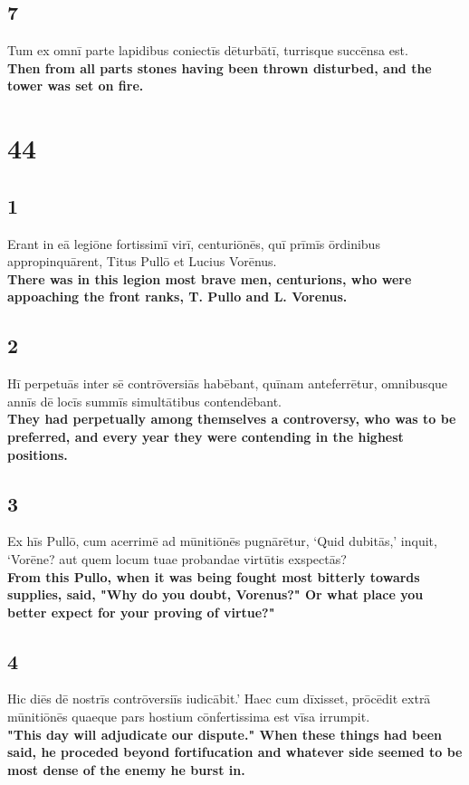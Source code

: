 \documentclass{article}
\begin{document}
\subsection*{7}
Tum ex omnī parte lapidibus coniectīs dēturbātī, turrisque succēnsa est.\\
\textbf{Then from all parts stones having been thrown disturbed, and the tower was set on fire.}



\section*{44}

\subsection*{1}
Erant in eā legiōne fortissimī virī, centuriōnēs, quī prīmīs ōrdinibus appropinquārent, Titus Pullō et Lucius Vorēnus. \\
\textbf{There was in this legion most brave men, centurions, who were appoaching the front ranks, T. Pullo and L. Vorenus.}

\subsection*{2}
Hī perpetuās inter sē contrōversiās habēbant, quīnam anteferrētur, omnibusque annīs dē locīs summīs simultātibus contendēbant. \\
\textbf{They had perpetually among themselves a controversy, who was to be preferred, and every year they were contending in the highest positions.}

\subsection*{3}
Ex hīs Pullō, cum acerrimē ad mūnitiōnēs pugnārētur, ‘Quid dubitās,’ inquit, ‘Vorēne? aut quem locum tuae probandae virtūtis exspectās? \\
\textbf{From this Pullo, when it was being fought most bitterly towards supplies, said, "Why do you doubt, Vorenus?" Or what place you better expect for your proving of virtue?"}

\subsection*{4}
Hic diēs dē nostrīs contrōversiīs iudicābit.’ Haec cum dīxisset, prōcēdit extrā mūnitiōnēs quaeque pars hostium cōnfertissima est vīsa irrumpit. \\
\textbf{"This day will adjudicate our dispute." When these things had been said, he proceded beyond fortifucation and whatever side seemed to be most dense of the enemy he burst in. }
\end{document}
